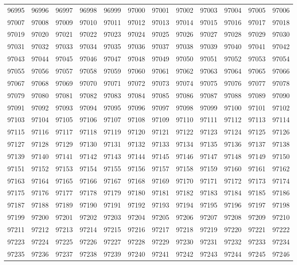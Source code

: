 \begin{center}
\begin{longtable}{llllllllllll}
96995 &96996 &96997 &96998 &96999 &97000 &97001 &97002 &97003 &97004 &97005 &97006 \\
97007 &97008 &97009 &97010 &97011 &97012 &97013 &97014 &97015 &97016 &97017 &97018 \\
97019 &97020 &97021 &97022 &97023 &97024 &97025 &97026 &97027 &97028 &97029 &97030 \\
97031 &97032 &97033 &97034 &97035 &97036 &97037 &97038 &97039 &97040 &97041 &97042 \\
97043 &97044 &97045 &97046 &97047 &97048 &97049 &97050 &97051 &97052 &97053 &97054 \\
97055 &97056 &97057 &97058 &97059 &97060 &97061 &97062 &97063 &97064 &97065 &97066 \\
97067 &97068 &97069 &97070 &97071 &97072 &97073 &97074 &97075 &97076 &97077 &97078 \\
97079 &97080 &97081 &97082 &97083 &97084 &97085 &97086 &97087 &97088 &97089 &97090 \\
97091 &97092 &97093 &97094 &97095 &97096 &97097 &97098 &97099 &97100 &97101 &97102 \\
97103 &97104 &97105 &97106 &97107 &97108 &97109 &97110 &97111 &97112 &97113 &97114 \\
97115 &97116 &97117 &97118 &97119 &97120 &97121 &97122 &97123 &97124 &97125 &97126 \\
97127 &97128 &97129 &97130 &97131 &97132 &97133 &97134 &97135 &97136 &97137 &97138 \\
97139 &97140 &97141 &97142 &97143 &97144 &97145 &97146 &97147 &97148 &97149 &97150 \\
97151 &97152 &97153 &97154 &97155 &97156 &97157 &97158 &97159 &97160 &97161 &97162 \\
97163 &97164 &97165 &97166 &97167 &97168 &97169 &97170 &97171 &97172 &97173 &97174 \\
97175 &97176 &97177 &97178 &97179 &97180 &97181 &97182 &97183 &97184 &97185 &97186 \\
97187 &97188 &97189 &97190 &97191 &97192 &97193 &97194 &97195 &97196 &97197 &97198 \\
97199 &97200 &97201 &97202 &97203 &97204 &97205 &97206 &97207 &97208 &97209 &97210 \\
97211 &97212 &97213 &97214 &97215 &97216 &97217 &97218 &97219 &97220 &97221 &97222 \\
97223 &97224 &97225 &97226 &97227 &97228 &97229 &97230 &97231 &97232 &97233 &97234 \\
97235 &97236 &97237 &97238 &97239 &97240 &97241 &97242 &97243 &97244 &97245 &97246 \\

\end{longtable}
\end{center}
